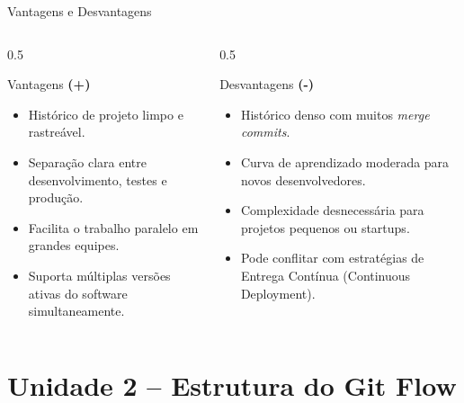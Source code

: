 \documentclass[aspectratio=169]{beamer}
\begin{document}
\begin{frame}{Vantagens e Desvantagens}
    \begin{columns}[T]
        \begin{column}{0.5\textwidth}
            \begin{block}{Vantagens \textcolor{meuverde}{\textbf{(+)}}}
                \begin{itemize}
                    \item Histórico de projeto limpo e rastreável.
                    \item Separação clara entre desenvolvimento, testes e produção.
                    \item Facilita o trabalho paralelo em grandes equipes.
                    \item Suporta múltiplas versões ativas do software simultaneamente.
                \end{itemize}
            \end{block}
        \end{column}
        \begin{column}{0.5\textwidth}
            \begin{block}{Desvantagens \textcolor{meuvermelhoescuro}{\textbf{(-)}}}
                \begin{itemize}
                    \item Histórico denso com muitos \textit{merge commits}.
                    \item Curva de aprendizado moderada para novos desenvolvedores.
                    \item Complexidade desnecessária para projetos pequenos ou startups.
                    \item Pode conflitar com estratégias de Entrega Contínua (Continuous Deployment).
                \end{itemize}
            \end{block}
        \end{column}
    \end{columns}
\end{frame}

\section{Unidade 2 -- Estrutura do Git Flow}
\end{document}
